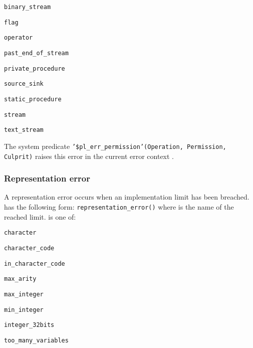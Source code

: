 \begin{ItemizeThreeCols}

\item \texttt{binary\_stream}

\item \texttt{flag}

\item \texttt{operator}

\item \texttt{past\_end\_of\_stream}

\item \texttt{private\_procedure}

\item \texttt{source\_sink}

\item \texttt{static\_procedure}

\item \texttt{stream}

\item \texttt{text\_stream}

\end{ItemizeThreeCols}

The system predicate \texttt{'\$pl\_err\_permission'(Operation, Permission,
Culprit)} raises this error in the current error context .

\subsubsection{Representation error}
\label{Representation-error}
A representation error occurs when an implementation limit has been
breached.  has the following form:
\texttt{representation\_error()} where 
is the name of the reached limit.  is one of:

\begin{ItemizeThreeCols}

\item \texttt{character}

\item \texttt{character\_code}

\item \texttt{in\_character\_code}

\item \texttt{max\_arity}

\item \texttt{max\_integer}

\item \texttt{min\_integer}

\item \texttt{integer\_32bits}

\item \texttt{too\_many\_variables}

\end{ItemizeThreeCols}

